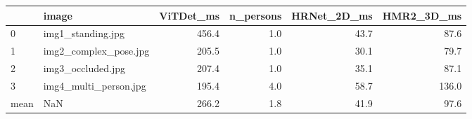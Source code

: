 \begin{tabular}{llrrrr}
\toprule
 & image & ViTDet_ms & n_persons & HRNet_2D_ms & HMR2_3D_ms \\
\midrule
0 & img1_standing.jpg & 456.4 & 1.0 & 43.7 & 87.6 \\
1 & img2_complex_pose.jpg & 205.5 & 1.0 & 30.1 & 79.7 \\
2 & img3_occluded.jpg & 207.4 & 1.0 & 35.1 & 87.1 \\
3 & img4_multi_person.jpg & 195.4 & 4.0 & 58.7 & 136.0 \\
mean & NaN & 266.2 & 1.8 & 41.9 & 97.6 \\
\bottomrule
\end{tabular}
